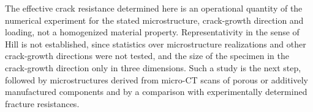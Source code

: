 \documentclass[pdflatex,sn-mathphys-num]{sn-jnl}%
\theoremstyle{thmstyleone}%
\theoremstyle{thmstyletwo}%
\theoremstyle{thmstylethree}%
\begin{document}
The effective crack resistance determined here is an operational quantity of the numerical experiment for the stated microstructure, crack-growth direction and loading, not a homogenized material property. Representativity in the sense of Hill is not established, since statistics over microstructure realizations and other crack-growth directions were not tested, and the size of the specimen in the crack-growth direction only in three dimensions. Such a study is the next step, followed by microstructures derived from micro-CT scans of porous or additively manufactured components and by a comparison with experimentally determined fracture resistances.












\end{document}
